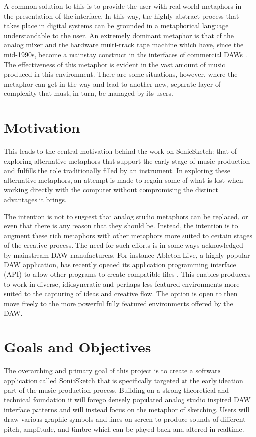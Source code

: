 \documentclass[12pt]{report}
\begin{document}
A common solution to this is to provide the user with real world metaphors in
the presentation of the interface. In this way, the highly abstract process that
takes place in digital systems can be grounded in a metaphorical language
understandable to the user. An extremely dominant metaphor is that of the analog
mixer and the hardware multi-track tape machine which have, since the mid-1990s,
become a mainstay construct in the interfaces of commercial DAWs
\cite{bell_journal_2015}. The effectiveness of this metaphor is evident in the
vast amount of music produced in this environment. There are some situations,
however, where the metaphor can get in the way and lead to another new, separate
layer of complexity that must, in turn, be managed by its users.

\chapter{Motivation}
\label{sec:orgf314316}
This leads to the central motivation behind the work on SonicSketch: that of
exploring alternative metaphors that support the early stage of music production
and fulfills the role traditionally filled by an instrument. In exploring these
alternative metaphors, an attempt is made to regain some of what is lost when
working directly with the computer without compromising the distinct advantages
it brings.

The intention is not to suggest that analog studio metaphors can be replaced, or
even that there is any reason that they should be. Instead, the intention is to
augment these rich metaphors with other metaphors more suited to certain stages
of the creative process. The need for such efforts is in some ways acknowledged
by mainstream DAW manufacturers. For instance Ableton Live, a highly popular DAW
application, has recently opened its application programming interface (API) to
allow other programs to create compatible files \cite{ableton_live_2017}. This
enables producers to work in diverse, idiosyncratic and perhaps less featured
environments more suited to the capturing of ideas and creative flow. The option
is open to then move freely to the more powerful fully featured environments
offered by the DAW.

\chapter{Goals and Objectives}
\label{sec:orgbd1f1f9}
The overarching and primary goal of this project is to create a software
application called SonicSketch that is specifically targeted at the early
ideation part of the music production process. Building on a strong theoretical
and technical foundation it will forego densely populated analog studio inspired
DAW interface patterns and will instead focus on the metaphor of sketching.
Users will draw various graphic symbols and lines on screen to produce sounds of
different pitch, amplitude, and timbre which can be played back and altered in
realtime.
\end{document}
